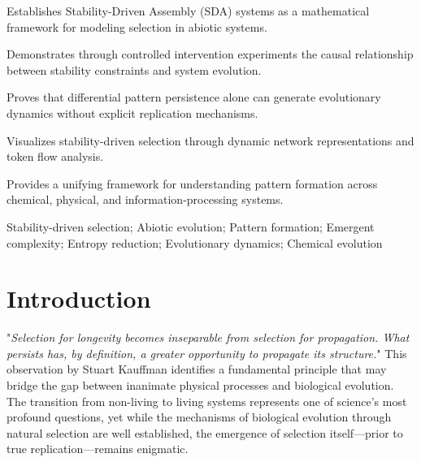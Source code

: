 \documentclass[preprint,12pt]{elsarticle}
\begin{document}
\begin{frontmatter}
\begin{highlights}
\item Establishes Stability-Driven Assembly (SDA) systems as a mathematical framework for modeling selection in abiotic systems.
\item Demonstrates through controlled intervention experiments the causal relationship between stability constraints and system evolution.
\item Proves that differential pattern persistence alone can generate evolutionary dynamics without explicit replication mechanisms.
\item Visualizes stability-driven selection through dynamic network representations and token flow analysis.
\item Provides a unifying framework for understanding pattern formation across chemical, physical, and information-processing systems.
\end{highlights}

\begin{keyword}
Stability-driven selection; Abiotic evolution; Pattern formation; Emergent complexity; Entropy reduction; Evolutionary dynamics; Chemical evolution
\end{keyword}




\end{frontmatter}


\section{Introduction}

"\textit{Selection for longevity becomes inseparable from selection for propagation. What persists has, by definition, a greater opportunity to propagate its structure.}" This observation by Stuart Kauffman \cite{kauffman1995home} identifies a fundamental principle that may bridge the gap between inanimate physical processes and biological evolution. The transition from non-living to living systems represents one of science's most profound questions, yet while the mechanisms of biological evolution through natural selection are well established, the emergence of selection itself—prior to true replication—remains enigmatic.
\end{document}
